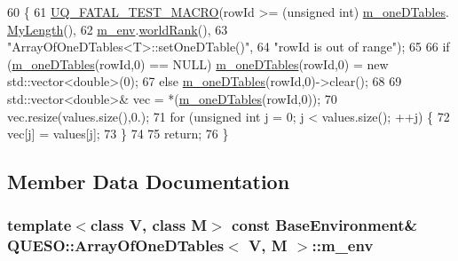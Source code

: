 \begin{DoxyCode}
60 \{
61   \hyperlink{_defines_8h_a56d63d18d0a6d45757de47fcc06f574d}{UQ\_FATAL\_TEST\_MACRO}(rowId >= (\textcolor{keywordtype}{unsigned} \textcolor{keywordtype}{int}) \hyperlink{class_q_u_e_s_o_1_1_array_of_one_d_tables_ad5e13befcb2e58dde1c13e396388a696}{m\_oneDTables}.
      \hyperlink{class_q_u_e_s_o_1_1_dist_array_af4a798f5defa6a37dfc82175c7f92f83}{MyLength}(),
62                       \hyperlink{class_q_u_e_s_o_1_1_array_of_one_d_tables_a51d23742e1c418efc4e829cb06fcda76}{m\_env}.\hyperlink{class_q_u_e_s_o_1_1_base_environment_a78b57112bbd0e6dd0e8afec00b40ffa7}{worldRank}(),
63                       \textcolor{stringliteral}{"ArrayOfOneDTables<T>::setOneDTable()"},
64                       \textcolor{stringliteral}{"rowId is out of range"});
65 
66   \textcolor{keywordflow}{if} (\hyperlink{class_q_u_e_s_o_1_1_array_of_one_d_tables_ad5e13befcb2e58dde1c13e396388a696}{m\_oneDTables}(rowId,0) == NULL) \hyperlink{class_q_u_e_s_o_1_1_array_of_one_d_tables_ad5e13befcb2e58dde1c13e396388a696}{m\_oneDTables}(rowId,0) = \textcolor{keyword}{new} 
      std::vector<double>(0);
67   \textcolor{keywordflow}{else}                               \hyperlink{class_q_u_e_s_o_1_1_array_of_one_d_tables_ad5e13befcb2e58dde1c13e396388a696}{m\_oneDTables}(rowId,0)->clear();
68 
69   std::vector<double>& vec = *(\hyperlink{class_q_u_e_s_o_1_1_array_of_one_d_tables_ad5e13befcb2e58dde1c13e396388a696}{m\_oneDTables}(rowId,0));
70   vec.resize(values.size(),0.);
71   \textcolor{keywordflow}{for} (\textcolor{keywordtype}{unsigned} \textcolor{keywordtype}{int} j = 0; j < values.size(); ++j) \{
72     vec[j] = values[j];
73   \}
74 
75   \textcolor{keywordflow}{return};
76 \}
\end{DoxyCode}


\subsection{Member Data Documentation}
\hypertarget{class_q_u_e_s_o_1_1_array_of_one_d_tables_a51d23742e1c418efc4e829cb06fcda76}{
\subsubsection[{m\-\_\-env}]{\setlength{\rightskip}{0pt plus 5cm}template$<$class V, class M$>$ const {\bf Base\-Environment}\& {\bf Q\-U\-E\-S\-O\-::\-Array\-Of\-One\-D\-Tables}$<$ V, M $>$\-::m\-\_\-env\hspace{0.3cm}{\ttfamily [private]}}}\label{class_q_u_e_s_o_1_1_array_of_one_d_tables_a51d23742e1c418efc4e829cb06fcda76}


